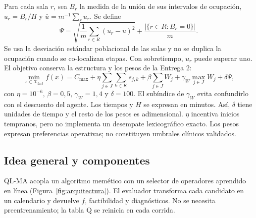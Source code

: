 \documentclass[11pt,a4paper]{article}
\newcommand{\Cmax}{C_{\max}}
\begin{document}
Para cada sala $r$, sea $B_r$ la medida de la unión de sus intervalos de ocupación, $u_r=B_r/H$ y $\bar u=m^{-1}\sum_r u_r$. Se define
\begin{equation}
\Psi=\sqrt{\frac{1}{m}\sum_{r\in R}(u_r-\bar u)^2}
+\frac{|\{r\in R:B_r=0\}|}{m}.
\label{eq:balance}
\end{equation}
Se usa la desviación estándar poblacional de las salas y no se duplica la ocupación cuando se co-localizan etapas. Con sobretiempo, $u_r$ puede superar uno. El objetivo conserva la estructura y los pesos de la Entrega 2:
\begin{equation}
\min_{x\in\mathcal X_{\mathrm{fact}}} f(x)=\Cmax
+\eta\sum_{j\in J}\sum_{k\in K}s_{j,k}
+\beta\sum_{j\in J}W_j+\gamma_W\max_{j\in J}W_j+\delta\Psi,
\label{eq:objetivo}
\end{equation}
con $\eta=10^{-6}$, $\beta=0{,}5$, $\gamma_W=1{,}4$ y $\delta=100$. El subíndice de $\gamma_W$ evita confundirlo con el descuento del agente. Los tiempos y $H$ se expresan en minutos. Así, $\delta$ tiene unidades de tiempo y el resto de los pesos es adimensional. $\eta$ incentiva inicios tempranos, pero no implementa un desempate lexicográfico exacto. Los pesos expresan preferencias operativas; no constituyen umbrales clínicos validados.

\subsection{Idea general y componentes}
QL-MA acopla un algoritmo memético con un selector de operadores aprendido en línea (Figura~\ref{fig:arquitectura}). El evaluador transforma cada candidato en un calendario y devuelve $f$, factibilidad y diagnósticos. No se necesita preentrenamiento; la tabla Q se reinicia en cada corrida.
\begin{center}
\label{fig:arquitectura}
\end{center}
\end{document}
